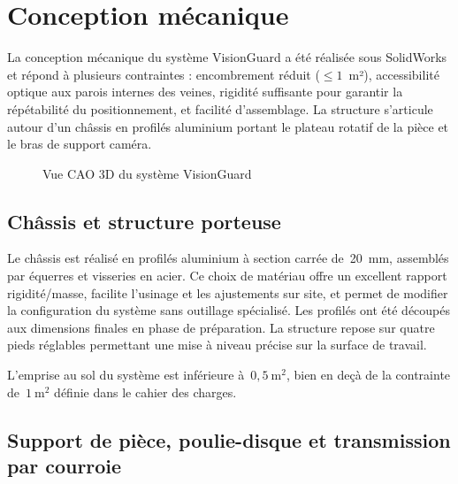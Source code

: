 \section{Conception mécanique}
\label{sec:conception_meca}

La conception mécanique du système VisionGuard a été réalisée sous SolidWorks et répond à
plusieurs contraintes : encombrement réduit ($\leq 1$~m²), accessibilité optique aux parois
internes des veines, rigidité suffisante pour garantir la répétabilité du positionnement, et
facilité d'assemblage. La structure s'articule autour d'un châssis en profilés aluminium
portant le plateau rotatif de la pièce et le bras de support caméra.

\begin{figure}[H]
\centering
\caption{Vue CAO 3D du système VisionGuard}
\label{fig:cao_visionguard}
\end{figure}

\subsection{Châssis et structure porteuse}

Le châssis est réalisé en profilés aluminium à section carrée de~20~mm, assemblés par
équerres et visseries en acier. Ce choix de matériau offre un excellent rapport
rigidité/masse, facilite l'usinage et les ajustements sur site, et permet de modifier
la configuration du système sans outillage spécialisé. Les profilés ont été découpés aux
dimensions finales en phase de préparation. La structure repose sur quatre pieds réglables
permettant une mise à niveau précise sur la surface de travail.

L'emprise au sol du système est inférieure à~$0{,}5~\mathrm{m}^2$, bien en deçà de la
contrainte de~$1~\mathrm{m}^2$ définie dans le cahier des charges.

\subsection{Support de pièce, poulie-disque et transmission par courroie}

